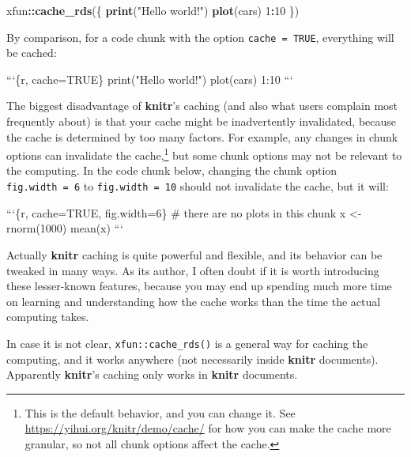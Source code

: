 \documentclass[
  11pt,
]{krantz}
\newenvironment{Shaded}{\begin{snugshade}}{\end{snugshade}}
\newcommand{\BaseNTok}[1]{\textcolor[rgb]{0.06,0.06,0.06}{#1}}
\newcommand{\DecValTok}[1]{\textcolor[rgb]{0.06,0.06,0.06}{#1}}
\newcommand{\KeywordTok}[1]{\textcolor[rgb]{0.27,0.27,0.27}{\textbf{#1}}}
\newcommand{\NormalTok}[1]{#1}
\newcommand{\OperatorTok}[1]{\textcolor[rgb]{0.43,0.43,0.43}{\textbf{#1}}}
\newcommand{\StringTok}[1]{\textcolor[rgb]{0.5,0.5,0.5}{#1}}
\begin{document}
\begin{Shaded}
\begin{Highlighting}[]
\NormalTok{xfun}\OperatorTok{::}\KeywordTok{cache_rds}\NormalTok{(\{}
  \KeywordTok{print}\NormalTok{(}\StringTok{"Hello world!"}\NormalTok{)}
  \KeywordTok{plot}\NormalTok{(cars)}
  \DecValTok{1}\OperatorTok{:}\DecValTok{10}
\NormalTok{\})}
\end{Highlighting}
\end{Shaded}

By comparison, for a code chunk with the option \texttt{cache\ =\ TRUE}, everything will be cached:

\begin{Shaded}
\begin{Highlighting}[]
\BaseNTok{```\{r, cache=TRUE\}}
\BaseNTok{print("Hello world!")}
\BaseNTok{plot(cars)}
\BaseNTok{1:10}
\BaseNTok{```}
\end{Highlighting}
\end{Shaded}

The biggest disadvantage of \textbf{knitr}'s caching (and also what users complain most frequently about) is that your cache might be inadvertently invalidated, because the cache is determined by too many factors. For example, any changes in chunk options can invalidate the cache,\footnote{This is the default behavior, and you can change it. See \url{https://yihui.org/knitr/demo/cache/} for how you can make the cache more granular, so not all chunk options affect the cache.} but some chunk options may not be relevant to the computing. In the code chunk below, changing the chunk option \texttt{fig.width\ =\ 6} to \texttt{fig.width\ =\ 10} should not invalidate the cache, but it will:

\begin{Shaded}
\begin{Highlighting}[]
\BaseNTok{```\{r, cache=TRUE, fig.width=6\}}
\BaseNTok{# there are no plots in this chunk}
\BaseNTok{x <- rnorm(1000)}
\BaseNTok{mean(x)}
\BaseNTok{```}
\end{Highlighting}
\end{Shaded}

Actually \textbf{knitr} caching is quite powerful and flexible, and its behavior can be tweaked in many ways. As its author, I often doubt if it is worth introducing these lesser-known features, because you may end up spending much more time on learning and understanding how the cache works than the time the actual computing takes.

In case it is not clear, \texttt{xfun::cache\_rds()} is a general way for caching the computing, and it works anywhere (not necessarily inside \textbf{knitr} documents). Apparently \textbf{knitr}'s caching only works in \textbf{knitr} documents.
\end{document}
